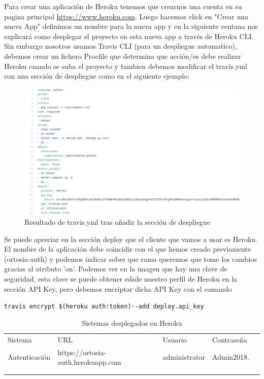 \documentclass[12pt]{article}
\begin{document}
Para crear una aplicación de Heroku tenemos que crearnos una cuenta en su pagina principal \url{https://www.heroku.com}. Luego hacemos click en "Crear una nueva App" definimos un nombre para la nueva app y en la siguiente ventana nos explicará como desplegar el proyecto en esta nueva app a través de Heroku CLI. Sin embargo nosotros usamos Travis CLI (para un despliegue automatico), debemos crear un fichero Procfile que determina que acción/es debe realizar Heroku cuando se suba el proyecto y tambien debemos modificar el travis.yml con una sección de despliegue como en el siguiente ejemplo:

\begin{figure}[hbt!]
\centering
\includegraphics[width=1\textwidth]{travisyml.png}
\caption{Resultado de travis.yml tras añadir la sección de despliegue}
\end{figure}

Se puede apreciar en la sección deploy que el cliente que vamos a usar es Heroku. El nombre de la aplicación debe coincidir con el que hemos creado previamente (ortosia-auth) y podemos indicar sobre que rama queremos que tome los cambios gracias al atributo 'on'. 
Podemos ver en la imagen que hay una clave de seguridad, esta clave se puede obtener edsde nuestro perfil de Heroku en la sección API Key, pero debemos encriptar dicha API Key con el comando

\verb|travis encrypt $(heroku auth:token)--add deploy.api_key|
\cite{heroku-deployement}


\begin{table}[H]
\begin{tabular}{lllll}
\cline{1-4}
\multicolumn{1}{|l|}{Sistema} & \multicolumn{1}{l|}{URL} & \multicolumn{1}{l|}{Usuario} & \multicolumn{1}{l|}{Contraseña} &  \\ \cline{1-4}
\multicolumn{1}{|l|}{Autenticación} & \multicolumn{1}{l|}{https://ortosia-auth.herokuapp.com} & \multicolumn{1}{l|}{administrator} & \multicolumn{1}{l|}{Admin2018.} &  \\ \cline{1-4}
\multicolumn{1}{|l|}{} & \multicolumn{1}{l|}{} & \multicolumn{1}{l|}{} & \multicolumn{1}{l|}{} &  \\ \cline{1-4}
                       &                       &                       &                       & 
\end{tabular}
\caption{Sistemas desplegados en Heroku}
\end{table}
\end{document}
